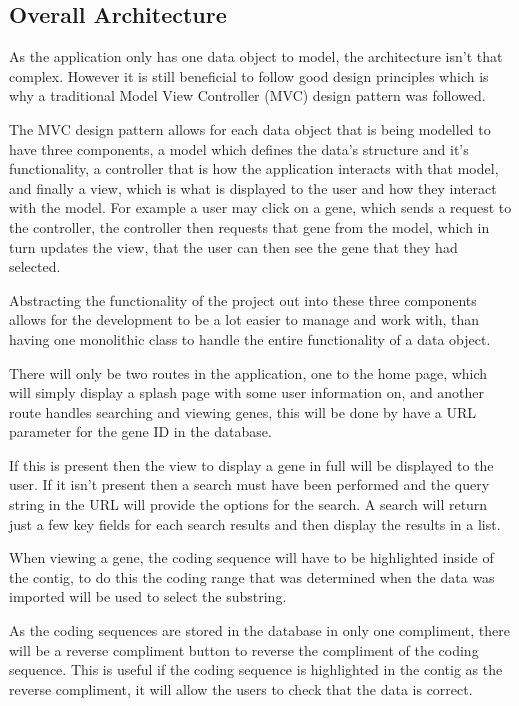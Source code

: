 {    
\subsection{Overall Architecture}
As the application only has one data object to model, the architecture isn't that complex. However it is still beneficial to follow good design principles which is why a traditional Model View Controller (MVC) design pattern\cite{mvc} was followed. 

The MVC design pattern allows for each data object that is being modelled to have three components, a model which defines the data's structure and it's functionality, a controller that is how the application interacts with that model, and finally a view, which is what is displayed to the user and how they interact with the model. For example a user may click on a gene, which sends a request to the controller, the controller then requests that gene from the model, which in turn updates the view, that the user can then see the gene that they had selected. 

Abstracting the functionality of the project out into these three components allows for the development to be a lot easier to manage and work with, than having one monolithic class to handle the entire functionality of a data object. 

There will only be two routes in the application, one to the home page, which will simply display a splash page with some user information on, and another route handles searching and viewing genes, this will be done by have a URL parameter for the gene ID in the database. 

If this is present then the view to display a gene in full will be displayed to the user. If it isn't present then a search must have been performed and the query string in the URL will provide the options for the search. A search will return just a few key fields for each search results and then display the results in a list.   

When viewing a gene, the coding sequence will have to be highlighted inside of the contig, to do this the coding range that was determined when the data was imported will be used to select the substring. 

As the coding sequences are stored in the database in only one compliment, there will be a reverse compliment button to reverse the compliment of the coding sequence. This is useful if the coding sequence is highlighted in the contig as the reverse compliment, it will allow the users to check that the data is correct. 

}
